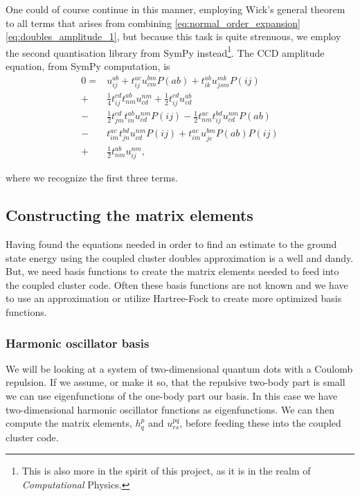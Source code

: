 \documentclass[
    a4paper, aps, twocolumn, floatfix, superscriptaddress,
    nofootinbib]{revtex4-1}
\newcommand{\1}{\mathds{1}}
\begin{document}
		One could of course continue in this manner, employing Wick's general theorem to all
		terms that arises from combining \autoref{eq:normal_order_expansion}
		\autoref{eq:doubles_amplitude_1}, but because this task is quite strenuous, we employ
		the second quantisation library from SymPy instead\footnote{This is also more in the
		spirit of this project, as it is in the realm of \emph{Computational} Physics.}.
		The CCD amplitude equation, from SymPy computation, is 
		\begin{equation}
		\begin{aligned}
			0 =& u^{ab}_{ij} + t^{ac}_{ij} u^{bm}_{cm} P(ab) + t^{ab}_{ik} u^{mk}_{jsm} P(ij) \\
				 +& \frac{1}{4}t^{cd}_{ij} t^{ab}_{nm} u^{nm}_{cd} + \frac{1}{2}t^{cd}_{ij} u^{ab}_{cd} \\
				 -& \frac{1}{2}t^{cd}_{jm} t^{ab}_{in} u^{nm}_{cd} P(ij) - \frac{1}{2}t^{ac}_{nm} t^{bd}_{ij} u^{nm}_{cd} P(ab) \\
				 -& t^{ac}_{im} t^{bd}_{jn} u^{nm}_{cd} P(ij) + t^{ac}_{im} u^{bm}_{jc} P(ab) P(ij) \\
				 +& \frac{1}{2}t^{ab}_{nm} u^{nm}_{ij}, 
		\end{aligned}
		\end{equation}
		
		where we recognize the first three terms. 
		
    \subsection{Constructing the matrix elements}
        Having found the equations needed in order to find an estimate to the
        ground state energy using the coupled cluster doubles approximation is a
        well and dandy. But, we need basis functions to create the matrix
        elements needed to feed into the coupled cluster code.  Often these
        basis functions are not known and we have to use an approximation or
        utilize Hartree-Fock to create more optimized basis functions.

        \subsubsection{Harmonic oscillator basis}
            We will be looking at a system of two-dimensional quantum dots with
            a Coulomb repulsion.  If we assume, or make it so, that the
            repulsive two-body part is small we can use eigenfunctions of the
            one-body part our basis. In this case we have two-dimensional
            harmonic oscillator functions as eigenfunctions. We can then compute
            the matrix elements, $h_q^p$ and $u_{rs}^{pq}$, before feeding these
            into the coupled cluster code.
\end{document}
